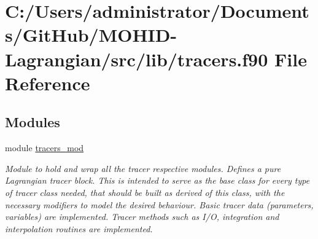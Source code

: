 \hypertarget{tracers_8f90}{}\section{C\+:/\+Users/administrator/\+Documents/\+Git\+Hub/\+M\+O\+H\+I\+D-\/\+Lagrangian/src/lib/tracers.f90 File Reference}
\label{tracers_8f90}
\subsection*{Modules}
\begin{DoxyCompactItemize}
\item 
module \hyperlink{namespacetracers__mod}{tracers\+\_\+mod}
\begin{DoxyCompactList}\small\item\em Module to hold and wrap all the tracer respective modules. Defines a pure Lagrangian tracer block. This is intended to serve as the base class for every type of tracer class needed, that should be built as derived of this class, with the necessary modifiers to model the desired behaviour. Basic tracer data (parameters, variables) are implemented. Tracer methods such as I/O, integration and interpolation routines are implemented. \end{DoxyCompactList}\end{DoxyCompactItemize}
